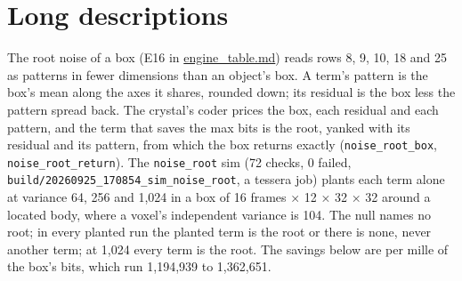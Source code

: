 \section{\texorpdfstring{Long descriptions}{Long descriptions}}

The root noise of a box (E16 in \hyperref[chap:engine-table]{engine\_\allowbreak{}table.md}) reads rows 8, 9, 10, 18 and 25 as patterns in fewer dimensions than an object's box. A term's pattern is the box's mean along the axes it shares, rounded down; its residual is the box less the pattern spread back. The crystal's coder prices the box, each residual and each pattern, and the term that saves the max bits is the root, yanked with its residual and its pattern, from which the box returns exactly (\texttt{noise\_\allowbreak{}root\_\allowbreak{}box}, \texttt{noise\_\allowbreak{}root\_\allowbreak{}return}). The \texttt{noise\_\allowbreak{}root} sim (72 checks, 0 failed, \texttt{build/\allowbreak{}20260925\_\allowbreak{}170854\_\allowbreak{}sim\_\allowbreak{}noise\_\allowbreak{}root}, a tessera job) plants each term alone at variance 64, 256 and 1,024 in a box of 16 frames × 12 × 32 × 32 around a located body, where a voxel's independent variance is 104. The null names no root; in every planted run the planted term is the root or there is none, never another term; at 1,024 every term is the root. The savings below are per mille of the box's bits, which run 1,194,939 to 1,362,651.


